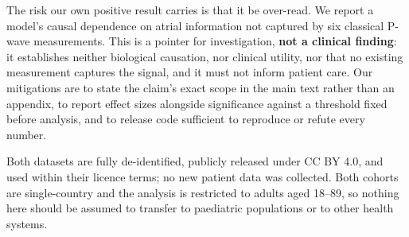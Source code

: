 \documentclass{article}
\begin{document}
The risk our own positive result carries is that it be over-read. We report a
model's causal dependence on atrial information not captured by six classical
P-wave measurements. This is a pointer for investigation, \textbf{not a clinical
finding}: it establishes neither biological causation, nor clinical utility, nor
that no existing measurement captures the signal, and it must not inform patient
care. Our mitigations are to state the claim's exact scope in the main text
rather than an appendix, to report effect sizes alongside significance against a
threshold fixed before analysis, and to release code sufficient to reproduce or
refute every number.

Both datasets are fully de-identified, publicly released under CC BY 4.0, and
used within their licence terms; no new patient data was collected. Both cohorts
are single-country and the analysis is restricted to adults aged 18--89, so
nothing here should be assumed to transfer to paediatric populations or to other
health systems.
\end{document}
